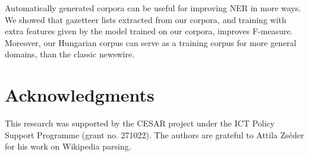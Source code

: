 \documentclass[11pt]{article}
\begin{document}
Automatically generated corpora can be useful for improving NER in more ways. We showed that gazetteer lists extracted from our corpora, and training with extra features given by the model trained on our corpora, improves F-measure. Moreover, our Hungarian corpus can serve as a training corpus for more general domains, than the classic newswire.  



\section*{Acknowledgments}

This research was supported by the CESAR project under the ICT Policy Support Programme (grant no. 271022). The authors are grateful to Attila Zséder for his work on Wikipedia parsing.
\end{document}
